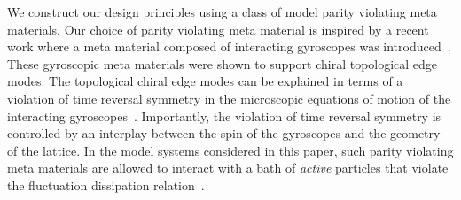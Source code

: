 \documentclass[
 preprint,
 preprintnumbers,
 amsmath,amssymb,
 aps,
 pre,
 longbibliography,
 superscriptaddress,
 10pt, twocolumn
]{revtex4-1}
\begin{document}

We construct our design principles using a class of model parity violating meta materials. Our choice of parity violating meta material is inspired by a recent work where a meta material composed of interacting gyroscopes was introduced~\cite{Nash2015TopologicalMechanics}. These gyroscopic meta materials were shown to support chiral topological edge modes. The topological chiral edge modes can be explained in terms of a violation of time reversal symmetry in the microscopic equations of motion of the interacting gyroscopes~\cite{Nash2015TopologicalMechanics,Mitchell2018AmorphousTopological}. Importantly, the violation of time reversal symmetry is controlled by an interplay between the spin of the gyroscopes and the geometry of the lattice. In the model systems considered in this paper, such parity violating meta materials are allowed to interact with a bath of \textit{active} particles that violate the fluctuation dissipation relation~\cite{Fodor2016HowFar}. %
\end{document}
